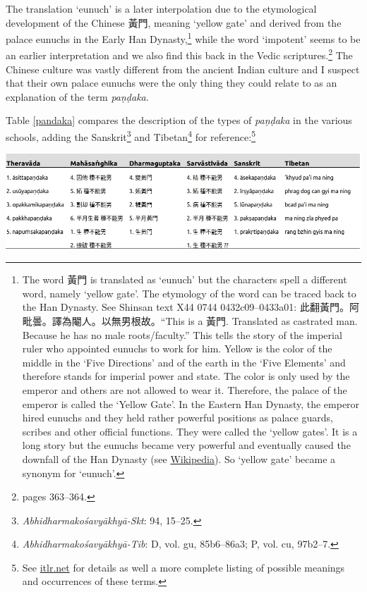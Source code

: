 The translation `eunuch' is a later interpolation due to the etymological development of the Chinese 黃門, meaning `yellow gate' and derived from the palace eunuchs in the Early Han Dynasty,\footnote{The word 黃門 is translated as `eunuch' but the characters spell a different word, namely `yellow gate'. The etymology of the word can be traced back to the Han Dynasty. See Shinsan text X44 0744 0432c09–0433a01: 此翻黃門。阿毗曇。譯為閹人。以無男根故。``This is a 黃門. Translated as castrated man. Because he has no male roots/faculty.'' This tells the story of the imperial ruler who appointed eunuchs to work for him. Yellow is the color of the middle in the `Five Directions' and of the earth in the `Five Elements' and therefore stands for imperial power and state. The color is only used by the emperor and others are not allowed to wear it. Therefore, the palace of the emperor is called the `Yellow Gate'. In the Eastern Han Dynasty, the emperor hired eunuchs and they held rather powerful positions as palace guards, scribes and other official functions. They were called the `yellow gates'. It is a long story but the eunuchs became very powerful and eventually caused the downfall of the Han Dynasty (see \href{https://en.wikipedia.org/wiki/Han_dynasty}{Wikipedia}). So `yellow gate' became a synonym for `eunuch'.} while the word `impotent' seems to be an earlier interpretation and we also find this back in the Vedic scriptures.\footnote{\cite{zwilling} pages 363–364.} The Chinese culture was vastly different from the ancient Indian culture and I suspect that their own palace eunuchs were the only thing they could relate to as an explanation of the term {\em paṇḍaka}.

Table \ref{pandaka} compares the description of the types of {\em paṇḍaka} in the various schools, adding the Sanskrit\footnote{{\em Abhidharmakośavyākhyā-Skt}: 94, 15–25.} and Tibetan\footnote{{\em Abhidharmakośavyākhyā-Tib}: D, vol. gu, 85b6–86a3; P, vol. cu, 97b2–7.} for reference:\footnote{See \href{http://www.itlr.net/hwid:281142}{itlr.net} for details as well a more complete listing of possible meanings and occurrences of these terms.}

\bigskip
\includegraphics[width=\textwidth]{pandaka.jpg}
\begin{minipage}{\textwidth}
\label{pandaka}
\end{minipage}
\medskip

